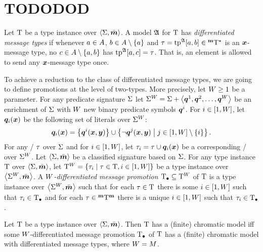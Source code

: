 \section{TODODOD}

\begin{definition}
Let $\mathrm{T}$ be a type instance over $\left\langle \mathrm{\Sigma},\bar{\bm{m}} \right\rangle$.
A model $\mathfrak{A}$ for $\mathrm{T}$ has \emph{differentiated message types}
if whenever $a\in A$, $b\in A\setminus\left\{a\right\}$
and $\tau = \operatorname{tp}^{\mathfrak{A}}[a,b]\in{{}^{\bm{\mathrm{m}}}{\mathrm{T}}^{\star}}$ is an $\bm{x}$-message type,
no $c\in A\setminus\left\{a,b\right\}$ has $\operatorname{tp}^{\mathfrak{A}}[a,c] = \tau$.
That is, an element is allowed to send any $\bm{x}$-message type once.
\end{definition}
To achieve a reduction to the class of differentiated message types, we are
going to define promotions at the level of two-types.
More precisely, let $W\geq1$ be a parameter.
For any predicate signature $\mathrm{\Sigma}$ let ${\mathrm{\Sigma}}^{W} = \mathrm{\Sigma} +
\left\langle \bm{q}^{1},\bm{q}^{2},\dots,\bm{q}^{W} \right\rangle$ be an enrichment of $\mathrm{\Sigma}$ with $W$ new binary
predicate symbols $\bm{q}^{i}$.
For $i\in[1,W]$, let $\bm{q}_{i}(\bm{x})$ be the following set of literals over
${\mathrm{\Sigma}}^{W}$:
\[
\bm{q}_{i}(\bm{x}) =
\left\{\bm{q}^{i}(\bm{x},\bm{y})\right\}\cup\left\{\lnot\bm{q}^{j}(\bm{x},\bm{y})\mathrel{}\middle|\mathrel{}j\in[1,W]\setminus\left\{i\right\}\right\}.
\]
For any \twotype/ $\tau$ over $\mathrm{\Sigma}$ and for $i\in[1,W]$, let ${\tau}_{i}
= \tau\cup\bm{q}_{i}(\bm{x})$ be a corresponding \twotype/ over ${\mathrm{\Sigma}}^{W}$.
Let $\left\langle \mathrm{\Sigma},\bar{\bm{m}} \right\rangle$ be a classified signature based on $\mathrm{\Sigma}$.
For any type instance $\mathrm{T}$ over $\left\langle \mathrm{\Sigma},\bar{\bm{m}} \right\rangle$, let
${\mathrm{T}}^{W} = \left\{{\tau}_{i}\mathrel{}\middle|\mathrel{}\tau\in\mathrm{T},i\in[1,W]\right\}$ be a type instance
over $\left\langle {\mathrm{\Sigma}}^{W},\bar{\bm{m}} \right\rangle$.
A \emph{$W$-differentiated message promotion $\mathrm{T}_{\bullet}\subseteq{\mathrm{T}}^{W}$} of
$\mathrm{T}$ is a type instance over $\left\langle {\mathrm{\Sigma}}^{W},\bar{\bm{m}} \right\rangle$ such that for each
$\tau\in\mathrm{T}$ there is some $i\in[1,W]$ such that ${\tau}_{i}\in\mathrm{T}_{\bullet}$ and for
each $\tau\in{{}^{\bm{\mathrm{m}}}{\mathrm{T}}^{\bm{\mathrm{m}}}}$ there is a unique $i\in[1,W]$ such that
${\tau}_{i}\in\mathrm{T}_{\bullet}$.
\begin{remark}
Let $\mathrm{T}$ be a type instance over $\left\langle \mathrm{\Sigma},\bar{\bm{m}} \right\rangle$.
Then $\mathrm{T}$ has a (finite) chromatic model iff some $W$-differentiated message
promotion $\mathrm{T}_{\bullet}$ of $\mathrm{T}$ has a (finite) chromatic model with differentiated
message types, where $W = M$.
\end{remark}

